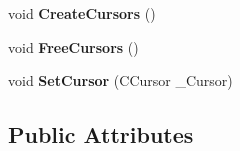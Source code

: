 \begin{DoxyCompactItemize}
\item 
\hypertarget{struct_c_tw_mgr_a264af57eb006a44b86617edb79d15bb0}{void {\bfseries Create\+Cursors} ()}\label{struct_c_tw_mgr_a264af57eb006a44b86617edb79d15bb0}

\item 
\hypertarget{struct_c_tw_mgr_a929510cfe9143cb868606e98110303dd}{void {\bfseries Free\+Cursors} ()}\label{struct_c_tw_mgr_a929510cfe9143cb868606e98110303dd}

\item 
\hypertarget{struct_c_tw_mgr_ac2dfd3a9edbdbb9691f5a276b24290e0}{void {\bfseries Set\+Cursor} (C\+Cursor \+\_\+\+Cursor)}\label{struct_c_tw_mgr_ac2dfd3a9edbdbb9691f5a276b24290e0}

\end{DoxyCompactItemize}
\subsection*{Public Attributes}
